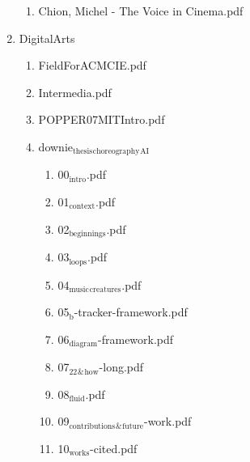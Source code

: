 \documentclass[11pt]{article}
\begin{document}
\begin{enumerate}
\begin{enumerate}
\item Chion, Michel - The Voice in Cinema.pdf
\label{sec-1-1-1-1-11-24-30-2}
\end{enumerate}

\item DigitalArts
\label{sec-1-1-1-1-11-24-31}
\begin{enumerate}
\item FieldForACMCIE.pdf
\label{sec-1-1-1-1-11-24-31-1}

\item Intermedia.pdf
\label{sec-1-1-1-1-11-24-31-2}

\item POPPER07MITIntro.pdf
\label{sec-1-1-1-1-11-24-31-3}

\item downie$_{\text{thesis}}$$_{\text{choreography}}$$_{\text{AI}}$
\label{sec-1-1-1-1-11-24-31-4}
\begin{enumerate}
\item 00$_{\text{intro}}$.pdf
\label{sec-1-1-1-1-11-24-31-4-1}

\item 01$_{\text{context}}$.pdf
\label{sec-1-1-1-1-11-24-31-4-2}

\item 02$_{\text{beginnings}}$.pdf
\label{sec-1-1-1-1-11-24-31-4-3}

\item 03$_{\text{loops}}$.pdf
\label{sec-1-1-1-1-11-24-31-4-4}

\item 04$_{\text{music}}$$_{\text{creatures}}$.pdf
\label{sec-1-1-1-1-11-24-31-4-5}

\item 05$_{\text{b}}$-tracker-framework.pdf
\label{sec-1-1-1-1-11-24-31-4-6}

\item 06$_{\text{diagram}}$-framework.pdf
\label{sec-1-1-1-1-11-24-31-4-7}

\item 07$_{\text{22}}$$_{\text{\&}}$$_{\text{how}}$-long.pdf
\label{sec-1-1-1-1-11-24-31-4-8}

\item 08$_{\text{fluid}}$.pdf
\label{sec-1-1-1-1-11-24-31-4-9}

\item 09$_{\text{contributions}}$$_{\text{\&}}$$_{\text{future}}$-work.pdf
\label{sec-1-1-1-1-11-24-31-4-10}

\item 10$_{\text{works}}$-cited.pdf
\label{sec-1-1-1-1-11-24-31-4-11}


\end{enumerate}
\end{enumerate}
\end{enumerate}
\end{document}
